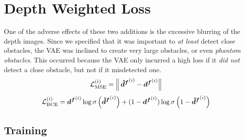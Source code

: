 \section{Depth Weighted Loss}
\label{sec:8_depth}
One of the adverse effects of these two additions is the excessive blurring of the depth images. Since we specified that it was important to \textit{at least} detect close obstacles, the VAE was inclined to create very large obstacles, or even \textit{phantom obstacles}. This occurred because the VAE only incurred a high loss if it \textit{did not} detect a close obstacle, but not if it misdetected one. 
\begin{equation}
    \mathcal{L}^{(i)}_{\text{MSE}} = \left\lVert\, \boldsymbol{\hat{d}^f}^{(i)} - \boldsymbol{d^f}^{(i)}\right\rVert
    \label{eq:8_mse_depth_weighted_loss}
\end{equation}
\begin{equation}
    \mathcal{L}^{(i)}_{\text{BCE}} =\boldsymbol{d^f}^{(i)} \log \sigma\left(\boldsymbol{\hat{d}^f}^{(i)}\right) +  (1 - \boldsymbol{d^f}^{(i)}) \log \sigma\left(1 - \boldsymbol{\hat{d}^f}^{(i)}\right)
    \label{eq:8_bce_depth_weighted_loss}
\end{equation}


\subsection{Training}

